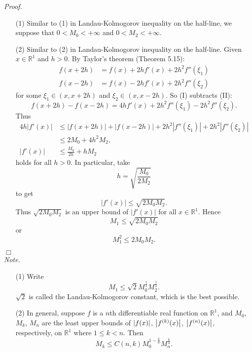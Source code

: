 \documentclass{article}
\begin{document}
\emph{Proof.}
\begin{enumerate}
\item[(1)]
Similar to (1) in Landau-Kolmogorov inequality on the half-line,
we suppose that $0 < M_0 < +\infty$ and $0 < M_2 < +\infty$.

\item[(2)]
Similar to (2) in Landau-Kolmogorov inequality on the half-line.
Given $x \in \mathbb{R}^1$ and $h>0$.
By Taylor's theorem (Theorem 5.15):
\begin{align*}
  f(x+2h) &= f(x) + 2h f'(x) + 2 h^2 f''(\xi_1) \tag{I} \\
  f(x-2h) &= f(x) - 2h f'(x) + 2 h^2 f''(\xi_2) \tag{II}
\end{align*}
for some $\xi_1 \in (x,x+2h)$ and $\xi_2 \in (x,x-2h)$.
So (I) subtracts (II):
\[
  f(x+2h)-f(x-2h) = 4h f'(x) + 2 h^2 f''(\xi_1) - 2 h^2 f''(\xi_2).
\]
Thus
\begin{align*}
  4h|f'(x)|
  &\leq |f(x+2h)| + |f(x-2h)| + 2 h^2 |f''(\xi_1)| + 2 h^2 |f''(\xi_2)| \\
  &\leq 2 M_0 + 4 h^2 M_2, \\
  |f'(x)|
  &\leq \frac{M_0}{2h} + h M_2
\end{align*}
holds for all $h > 0$.
In particular, take
\[
  h = \sqrt{\frac{M_0}{2M_2}}
\]
to get
\[
  |f'(x)| \leq \sqrt{2 M_0 M_2}.
\]
Thus $\sqrt{2 M_0 M_2}$ is an upper bound of $|f'(x)|$ for all $x \in \mathbb{R}^1$.
Hence
\[
  M_1 \leq \sqrt{2 M_0 M_2}
\]
or
\[
  M_1^2 \leq 2 M_0 M_2.
\]
\end{enumerate}
$\Box$ \\

\emph{Note.}
\begin{enumerate}
\item[(1)]
Write
\[
  M_1 \leq \sqrt{2} M_0^{\frac{1}{2}} M_2^{\frac{1}{2}}.
\]
$\sqrt{2}$ is called the Landau-Kolmogorov constant,
which is the best possible.

\item[(2)]
In general,
suppose $f$ is a $n$th differentiable real function on $\mathbb{R}^1$,
and $M_0$, $M_k$, $M_n$ are the least upper bounds of
$\abs{ f(x) }$, $\abs{ f^{(k)}(x) }$, $\abs{ f^{(n)}(x) }$, respectively, on $\mathbb{R}^1$
where $1 \leq k < n$.
Then
\[
  M_k \leq C(n,k) M_0^{1 - \frac{k}{n}} M_n^{\frac{k}{n}}.
\] \\
\end{enumerate}



\end{document}

